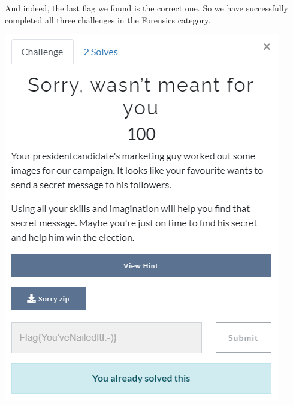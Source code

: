 \documentclass[../main.tex]{subfiles}
\begin{document}
And indeed, the last flag we found is the correct one. So we have successfully completed all three challenges in the Forensics category.
\begin{center}
    \includegraphics[width=0.6\linewidth]{images/Robbe/sorry_writeup7.png}
\end{center}
\end{document}
